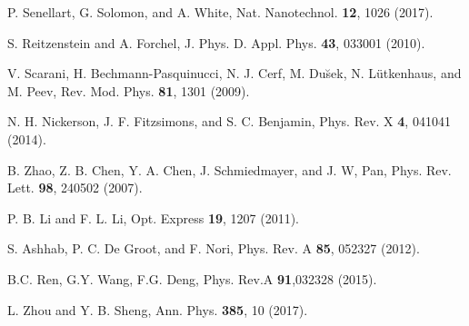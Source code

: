 \documentclass[aps,graphicx,twocolumn]{revtex4}%
\begin{document}
\begin{thebibliography}{199}
P. Senellart, G.  Solomon, and A. White,  Nat. Nanotechnol. \textbf{12}, 1026  (2017).

 S. Reitzenstein and A. Forchel,   J. Phys. D. Appl. Phys. \textbf{43}, 033001 (2010).

 V. Scarani,  H. Bechmann-Pasquinucci,  N. J. Cerf, M. Du\u{s}ek,  N. L\"{u}tkenhaus, and  M. Peev,  Rev. Mod. Phys. \textbf{81}, 1301 (2009).

N. H. Nickerson,   J. F.  Fitzsimons,  and S. C. Benjamin,    Phys.  Rev.  X  \textbf{4},  041041  (2014).

B. Zhao, Z. B. Chen, Y. A. Chen, J. Schmiedmayer, and J. W, Pan, Phys. Rev. Lett. \textbf{98}, 240502 (2007).

P. B. Li and F. L. Li, Opt. Express \textbf{19}, 1207 (2011).

S. Ashhab, P.  C.  De Groot, and F.  Nori, Phys. Rev. A \textbf{85}, 052327 (2012).

B.C. Ren, G.Y. Wang, F.G. Deng,  Phys. Rev.A \textbf{91},032328
(2015).




L. Zhou and Y. B. Sheng, Ann. Phys. \textbf{385}, 10 (2017).

\end{thebibliography}
\end{document}
